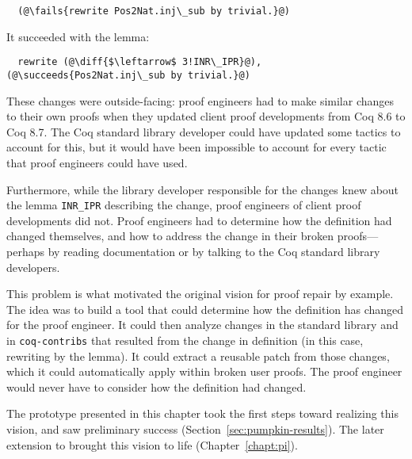 \begin{lstlisting}
  (@\fails{rewrite Pos2Nat.inj\_sub by trivial.}@)
\end{lstlisting}
It succeeded with the lemma:

\begin{lstlisting}
  rewrite (@\diff{$\leftarrow$ 3!INR\_IPR}@), (@\succeeds{Pos2Nat.inj\_sub by trivial.}@)
\end{lstlisting}
These changes were outside-facing: proof engineers had to make similar changes to their own proofs when
they updated client proof developments from Coq 8.6 to Coq 8.7.
The Coq standard library developer could have updated some tactics to account for this, but it 
would have been impossible to account for every tactic that proof engineers could have used.

Furthermore, while the library developer responsible for the changes knew about the lemma \lstinline{INR_IPR}
describing the change, proof engineers of client proof developments did not. Proof engineers
had to determine how the definition had changed themselves, and how to address the change in their broken proofs---perhaps 
by reading documentation or by talking to the Coq standard library developers. 

This problem is what motivated the original vision for proof repair by example.
The idea was to build a tool that could determine how the definition has changed for the proof engineer.
It could then analyze changes in the standard library and in \lstinline{coq-contribs}
that resulted from the change in definition (in this case, rewriting by the lemma).
It could extract a reusable patch from those changes, which it could automatically apply within broken user proofs. %
The proof engineer would never have to consider how the definition had changed.

The \sysname prototype presented in this chapter took the first steps toward realizing this vision,
and saw preliminary success (Section~\ref{sec:pumpkin-results}).
The later \toolnamec extension to \sysnamelong brought this vision to life (Chapter~\ref{chapt:pi}).


